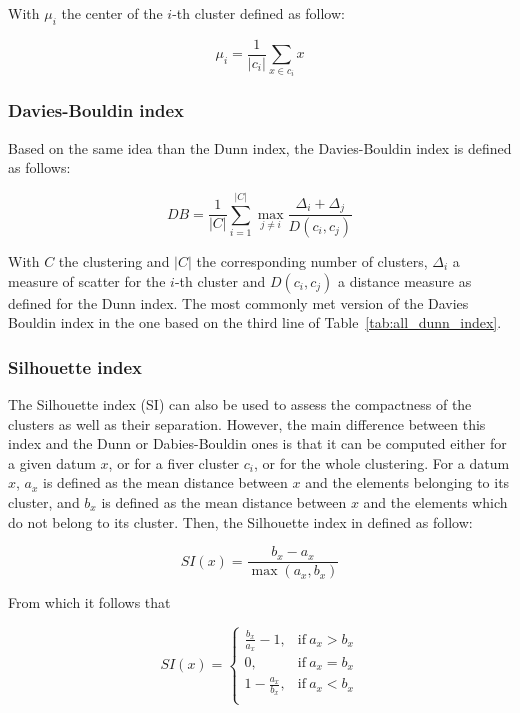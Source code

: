    With $\mu_i$ the center of the $i$-th cluster defined as follow:

    \begin{equation}
        \mu_i = \frac{1}{|c_i|}\sum_{x \in c_i}x
        \label{eq:mui}
    \end{equation}

    \subsubsection{Davies-Bouldin index}
    Based on the same idea than the Dunn index, the Davies-Bouldin index is defined as follows:

    \begin{equation}
DB = \frac{1}{|C|}\sum_{i=1}^{|C|} \max_{j \neq i} \frac{\Delta_i + \Delta_j}{D(c_i,c_j)}
        \label{eq:db_index}
    \end{equation}

    With $C$ the clustering and $|C|$ the corresponding number of clusters, $\Delta_i$ a measure of scatter for the $i$-th cluster and $D(c_i, c_j)$ a distance measure as defined for the Dunn index. The most commonly met version of the Davies Bouldin index in the one based on the third line of Table~\ref{tab:all_dunn_index}.

    \subsubsection{Silhouette index}
    The Silhouette index (SI) can also be used to assess the compactness of the clusters as well as their separation. However, the main difference between this index and the Dunn or Dabies-Bouldin ones is that it can be computed either for a given datum $x$, or for a fiver cluster $c_i$, or for the whole clustering. For a datum $x$, $a_x$ is defined as the mean distance between $x$ and the elements belonging to its cluster, and $b_x$ is defined as the mean distance between $x$ and the elements which do not belong to its cluster. Then, the Silhouette index in defined as follow:

    \begin{equation}
        SI(x) = \frac{b_x - a_x}{\max(a_x, b_x)}
        \label{eq:si_x}
    \end{equation}

    From which it follows that 

    \begin{equation}
        SI(x) = 
        \begin{cases}
            \frac{b_x}{a_x} - 1, & \text{if}\ a_x > b_x \\
            0, & \text{if}\ a_x = b_x \\
            1 - \frac{a_x}{b_x}, & \text{if}\ a_x < b_x \\
        \end{cases}
        \label{eq:si_x_detail}
    \end{equation}

